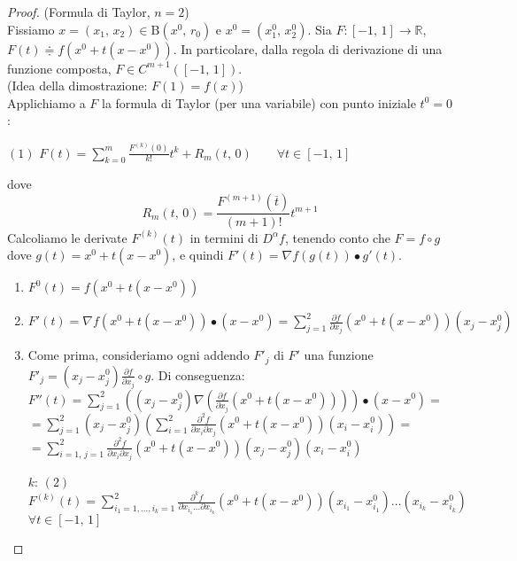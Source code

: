 \begin{proof}
(Formula di Taylor, $n=2$)\\
Fissiamo $x=(x_1,\,x_2) \in \mathrm{B}(x^0,\,r_0)$ e $x^0=(x_1^0,\,x_2^0)$. Sia $F : [-1,\,1] \rightarrow \mathbb{R}$, $F(t) \doteqdot f(x^0 + t(x-x^0))$. In particolare, dalla regola di derivazione di una funzione composta, $F \in C^{m+1} ([-1,\,1])$.\\
(Idea della dimostrazione: $F(1)=f(x)$)\\
Applichiamo a $F$ la formula di Taylor (per una variabile) con punto iniziale $t^0 = 0$:
\begin{center}
$\mathrm{(1)}$
\hfill
$\displaystyle F(t) = \sum_{k=0}^{m} \frac{F^{(k)}(0)}{k!}t^k + R_m(t,\,0) \qquad \forall t \in [-1,\,1]$
\hfill \null \\
\end{center}
dove 
$$R_m(t,\,0) = \frac{F^{(m+1)}(\overline{t})}{(m+1)!}t^{m+1}$$
Calcoliamo le derivate $F^{(k)}(t)$ in termini di $D^{\alpha}f$, tenendo conto che $F = f \circ g$ dove $g(t) = x^0+t(x-x^0)$, e quindi $F'(t) = \nabla f(g(t)) \bullet g'(t)$.
\begin{enumerate}[labelindent=\parindent,leftmargin=*,label=\underline{\textnormal{$k=\arabic*$}}:,start=0]
\item $\displaystyle F^{0}(t)=f(x^0+t(x-x^0))$
\item $\displaystyle F'(t) = \nabla f(x^0+t(x-x^0)) \bullet (x-x^0) = \sum_{j=1}^2 \frac{\partial f}{\partial x_j} (x^0+t(x-x^0))(x_j-x_j^0)$
\item Come prima, consideriamo ogni addendo $F'_j$ di $F'$ una funzione $\displaystyle F'_j =  (x_j-x_j^0)\frac{\partial f}{\partial x_j} \circ g$. Di conseguenza:\\
$\displaystyle F''(t) = \sum_{j=1}^2 \left ( (x_j-x_j^0) \nabla \left( \frac{\partial f}{\partial x_j} (x^0+t(x-x^0)) \right) \right) \bullet (x-x^0)=$\\
$\displaystyle =
\sum_{j=1}^2
(x_j-x_j^0) \left( 
\sum_{i=1}^2 \frac{\partial^2 f}{\partial x_i \partial x_j} (x^0+t(x-x^0))(x_i-x_i^0)
\right) = $\\
$\displaystyle =
\sum_{i=1,\,j=1}^2
\frac{\partial^2 f}{\partial x_i \partial x_j} (x^0+t(x-x^0))(x_j-x_j^0)(x_i-x_i^0)$
\item[\underline{\textnormal{$k$}}:] $\displaystyle \mathrm{(2)}$\\
$ \displaystyle F^{(k)}(t) = 
\sum_{i_1=1,\ldots,i_k=1}^2
\frac{\partial^k f}{\partial x_{i_1} \ldots \partial x_{i_k}}(x^0+t(x-x^0))
(x_{i_1}-x_{i_1}^0) \ldots (x_{i_k}-x_{i_k}^0)$\\
$\displaystyle \forall t \in [-1,\,1]$
\end{enumerate}


\end{proof}
